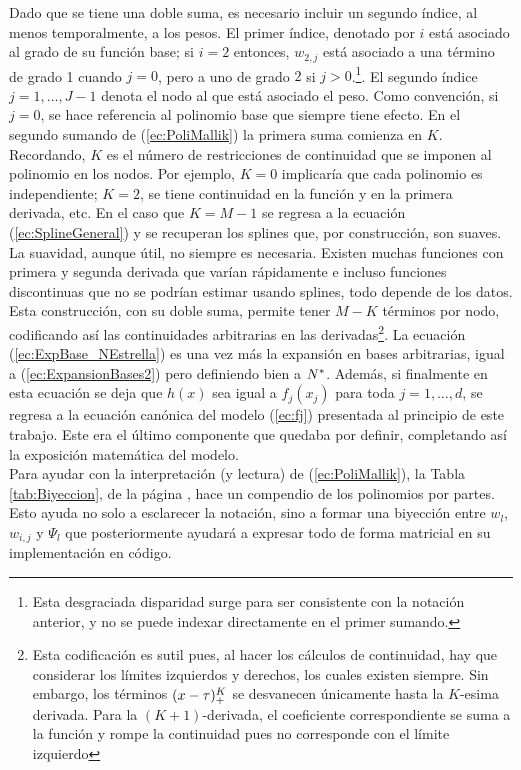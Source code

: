 \documentclass[../Main/Main.tex]{subfiles}
\begin{document}
Dado que se tiene una doble suma, es necesario incluir un segundo índice, al menos temporalmente, a los pesos. El primer índice, denotado por $i$ está asociado al grado de su función base; si $i = 2$ entonces, $w_{2,j}$ está asociado a una término de grado 1 cuando $j = 0$, pero a uno de grado $2$ si $j>0$.\footnote{Esta desgraciada disparidad surge para ser consistente con la notación anterior, y no se puede indexar directamente en el primer sumando.}. El segundo índice $j = 1,\ldots, J-1$ denota el nodo al que está asociado el peso. Como convención, si $j = 0$, se hace referencia al polinomio base que siempre tiene efecto. En el segundo sumando de (\ref{ec:PoliMallik}) la primera suma comienza en $K$. Recordando, $K$ es el número de restricciones de continuidad que se imponen al polinomio en los nodos. Por ejemplo, $K = 0$ implicaría que cada polinomio es independiente; $K = 2$, se tiene continuidad en la función y en la primera derivada, etc. En el caso que $K = M - 1$ se regresa a la ecuación (\ref{ec:SplineGeneral}) y se recuperan los splines que, por construcción, son suaves. La suavidad, aunque útil, no siempre es necesaria. Existen muchas funciones con primera y segunda derivada que varían rápidamente e incluso funciones discontinuas que no se podrían estimar usando splines, todo depende de los datos. Esta construcción, con su doble suma, permite tener $M-K$ términos por nodo, codificando así las continuidades arbitrarias en las derivadas\footnote{Esta codificación es sutil pues, al hacer los cálculos de continuidad, hay que considerar los límites izquierdos y derechos, los cuales existen siempre. Sin embargo, los términos $(x-\tau)^K_+$ se desvanecen únicamente hasta la $K$-esima derivada. Para la $(K+1)$-derivada, el coeficiente correspondiente se suma a la función y rompe la continuidad pues no corresponde con el límite izquierdo}. La ecuación (\ref{ec:ExpBase_NEstrella}) es una vez más la expansión en bases arbitrarias, igual a (\ref{ec:ExpansionBases2}) pero definiendo bien a $N^*$. Además, si finalmente en esta ecuación se deja que $h(x)$ sea igual a $f_j(x_j)$ para toda $j = 1,\ldots,d$, se regresa a la ecuación canónica del modelo (\ref{ec:fj}) presentada al principio de este trabajo. Este era el último componente que quedaba por definir, completando así la exposición matemática del modelo.\\

Para ayudar con la interpretación (y lectura) de (\ref{ec:PoliMallik}), la Tabla \ref{tab:Biyeccion}, de la página \pageref{tab:Biyeccion}, hace un compendio de los polinomios por partes. Esto ayuda no solo a esclarecer la notación, sino a formar una biyección entre $w_l$, $w_{i,j}$ y $\Psi_l$ que posteriormente ayudará a expresar todo de forma matricial en su implementación en código.\\
\end{document}

